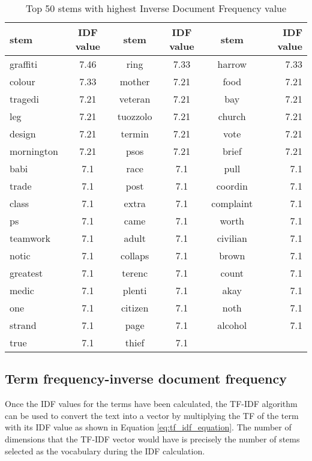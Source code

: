 \begin{table}
\begin{center}
\caption{Top 50 stems with highest Inverse Document Frequency value}
\label{tbl:idf_stems}
\begin{tabular}{lc|cc|cr|}
\toprule
stem&IDF value&stem&IDF value&stem&IDF value\\
\midrule
graffiti&7.46&ring&7.33&harrow&7.33\\ \hline 
colour&7.33&mother&7.21&food&7.21\\ \hline 
tragedi&7.21&veteran&7.21&bay&7.21\\ \hline 
leg&7.21&tuozzolo&7.21&church&7.21\\ \hline 
design&7.21&termin&7.21&vote&7.21\\ \hline 
mornington&7.21&psos&7.21&brief&7.21\\ \hline 
babi&7.1&race&7.1&pull&7.1\\ \hline 
trade&7.1&post&7.1&coordin&7.1\\ \hline 
class&7.1&extra&7.1&complaint&7.1\\ \hline 
ps&7.1&came&7.1&worth&7.1\\ \hline 
teamwork&7.1&adult&7.1&civilian&7.1\\ \hline 
notic&7.1&collaps&7.1&brown&7.1\\ \hline 
greatest&7.1&terenc&7.1&count&7.1\\ \hline 
medic&7.1&plenti&7.1&akay&7.1\\ \hline 
one&7.1&citizen&7.1&noth&7.1\\ \hline 
strand&7.1&page&7.1&alcohol&7.1\\ \hline 
true&7.1&thief&7.1&&\\
\bottomrule
\end{tabular}
\end{center}
\end{table}


\subsection{Term frequency-inverse document frequency}
Once the IDF values for the terms have been calculated, the TF-IDF algorithm can be used to convert the text into a vector by multiplying the TF of the term with its IDF value as shown in Equation \eqref{eq:tf_idf_equation}. The number of dimensions that the TF-IDF vector would have is precisely the number of stems selected as the vocabulary during the IDF calculation.

